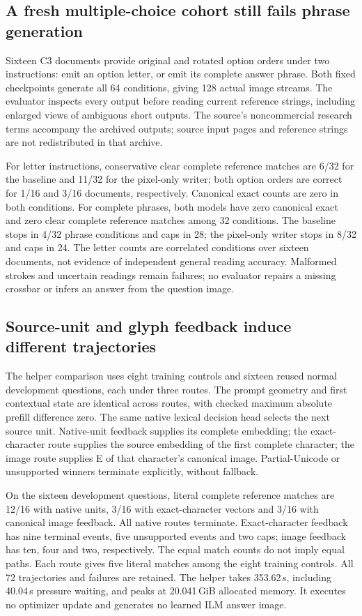 \subsection*{A fresh multiple-choice cohort still fails phrase generation}
Sixteen C3 documents provide original and rotated option orders under two
instructions: emit an option letter, or emit its complete answer phrase.
Both fixed checkpoints generate all 64 conditions, giving 128 actual image
streams. The evaluator inspects every output before reading current reference
strings, including enlarged views of ambiguous short outputs. The source's
noncommercial research terms accompany the archived outputs; source input
pages and reference strings are not redistributed in that archive.

For letter instructions, conservative clear complete reference matches are
6/32 for the baseline and 11/32 for the pixel-only writer; both option orders
are correct for 1/16 and 3/16 documents, respectively. Canonical exact counts
are zero in both conditions. For complete phrases, both models have zero
canonical exact and zero clear complete reference matches among 32 conditions.
The baseline stops in 4/32 phrase conditions and caps in 28; the pixel-only
writer stops in 8/32 and caps in 24. The letter counts are correlated conditions
over sixteen documents, not evidence of independent general reading accuracy.
Malformed strokes and uncertain readings remain failures; no evaluator repairs
a missing crossbar or infers an answer from the question image.

\subsection*{Source-unit and glyph feedback induce different trajectories}
The helper comparison uses eight training controls and sixteen reused normal
development questions, each under three routes. The prompt geometry and first
contextual state are identical across routes, with checked maximum absolute
prefill difference zero. The same native lexical decision head selects the
next source unit. Native-unit feedback supplies its complete embedding;
the exact-character route supplies the source embedding of the first complete
character; the image route supplies E of that character's canonical image.
Partial-Unicode or unsupported winners terminate explicitly, without fallback.

On the sixteen development questions, literal complete reference matches are
12/16 with native units, 3/16 with exact-character vectors and 3/16 with canonical
image feedback. All native routes terminate. Exact-character feedback has nine
terminal events, five unsupported events and two caps; image feedback has ten,
four and two, respectively. The equal match counts do not imply equal paths.
Each route gives five literal matches among the eight training controls.
All 72 trajectories and failures are retained. The helper takes 353.62\,s,
including 40.04\,s pressure waiting, and peaks at 20.041\,GiB allocated memory.
It executes no optimizer update and generates no learned ILM answer image.


